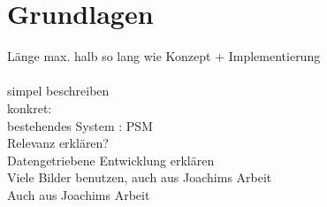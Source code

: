 \chapter{Grundlagen}\label{ch:grundlagen}

Länge max. halb so lang wie Konzept + Implementierung\\
\\
simpel beschreiben\\
konkret:\\
bestehendes System : PSM\\
Relevanz erklären?\\
Datengetriebene Entwicklung erklären \\
Viele Bilder benutzen, auch aus Joachims Arbeit\\
Auch aus Joachims Arbeit \\


\begin{deprecated}
\cite{davis93}


\end{deprecated}
